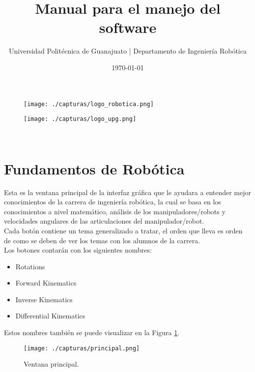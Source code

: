 \documentclass[12pt]{article}
\begin{document}
\title{Manual para el manejo del software}
\author{Universidad Politécnica de Guanajuato | Departamento de Ingeniería Robótica}
\date{\today}
\begin{figure}
	\begin{minipage}{.3\linewidth}
		\centering
		\texttt{[image: ./capturas/logo\_robotica.png]}
	\end{minipage}
	\begin{minipage}{1.3\linewidth}
		\centering
		\texttt{[image: ./capturas/logo\_upg.png]}
	\end{minipage}
\end{figure}
\maketitle
\thispagestyle{empty}
\newpage
$\ $
\setcounter{page}{1}
\tableofcontents
\newpage
$\ $
\section{Fundamentos de Robótica}
Esta es la ventana principal de la interfaz gráfica que le ayudara a entender mejor conocimientos de la carrera de ingeniería robótica, la cual se basa en los conocimientos a nivel matemático, análisis de los manipuladores/robots  y velocidades angulares de las articulaciones del manipulador/robot.\\
Cada botón contiene un tema generalizado a tratar, el orden que lleva es orden de como se deben de ver los temas con los alumnos de la carrera.\\
Los botones contarán con los siguientes nombres:
\begin{itemize}
	\item Rotations
	\item Forward Kinematics
	\item Inverse Kinematics
	\item Differential Kinematics
\end{itemize}
Estos nombres también se puede visualizar en la Figura \ref{fig:1}.
\begin{figure}[htb]
	\centering
	\texttt{[image: ./capturas/principal.png]}
	\caption{Ventana principal.} \label{fig:1}
\end{figure}
\end{document}
